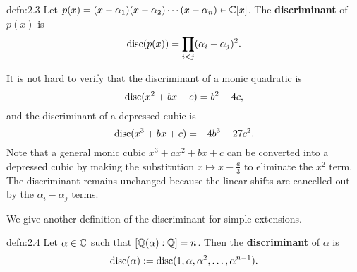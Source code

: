 \begin{defn}{defn:2.3}
    Let $p(x) = (x-\alpha_1)(x-\alpha_2) \cdots (x-\alpha_n) \in \mathbb{C}[x]$. 
    The {\bf discriminant} of $p(x)$ is 
    \[ \operatorname{disc}(p(x)) = \prod_{i<j} (\alpha_i - \alpha_j)^2. \] 
\end{defn}

It is not hard to verify that the discriminant of a monic quadratic is 
\[ \operatorname{disc}(x^2 + bx + c) = b^2 - 4c, \] 
and the discriminant of a depressed cubic is 
\[ \operatorname{disc}(x^3 + bx + c) = -4b^3 - 27c^2. \] 
Note that a general monic cubic $x^3 + ax^2 + bx + c$ can be converted 
into a depressed cubic by making the substitution $x \mapsto x - \frac{a}{3}$
to eliminate the $x^2$ term. The discriminant remains unchanged because 
the linear shifts are cancelled out by the $\alpha_i - \alpha_j$ terms. 

We give another definition of the discriminant for simple extensions. 

\begin{defn}{defn:2.4}
    Let $\alpha \in \mathbb{C}$ such that $[\mathbb{Q}(\alpha) : \mathbb{Q}] = n$. Then the 
    {\bf discriminant} of $\alpha$ is 
    \[ \operatorname{disc}(\alpha) := \operatorname{disc}(1, \alpha, \alpha^2, \dots, \alpha^{n-1}). \]
\end{defn}

